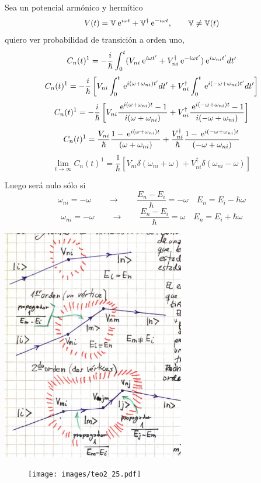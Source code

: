 \documentclass[10pt,oneside]{CBFT_book}
\begin{document}
Sea un potencial armónico y hermítico 
\[
	V(t) = \mathbb{V} \:\mathrm{e}^{i\omega t} + \mathbb{V}^\dagger \:\mathrm{e}^{-i\omega t},
		\qquad \mathbb{V}\neq \mathbb{V}(t)
\]
quiero ver probabilidad de transición a orden uno,
\[
	C_n(t)^1 = -\frac{i}{\hbar} \int_0^t ( V_{ni}\:\mathrm{e}^{i\omega t'}+ V_{ni}^\dagger \:\mathrm{e}^{-i\omega t'} )
		\:\mathrm{e}^{i\omega_{ni}t'}dt'
\]
\[
	C_n(t)^1 = -\frac{i}{\hbar} \left[ V_{ni} \int_0^t \:\mathrm{e}^{i(\omega +\omega_{ni})t'} dt' + 
		V_{ni}^\dagger \int_0^t \:\mathrm{e}^{i(-\omega +\omega_{ni})t'} dt' \right]
\]
\[
	C_n(t)^1 = -\frac{i}{\hbar} \left[ V_{ni} \frac{\:\mathrm{e}^{i(\omega +\omega_{ni})t} -1}{i( \omega +\omega_{ni} )}
		+ V_{ni}^\dagger \frac{\:\mathrm{e}^{i(-\omega +\omega_{ni})t} - 1}{i(-\omega +\omega_{ni})} \right]
\]
\[
	C_n(t)^1 = \frac{V_{ni}}{\hbar} \frac{1-\:\mathrm{e}^{i(\omega +\omega_{ni})t}}{( \omega +\omega_{ni} )}
		+ \frac{V_{ni}^\dagger}{\hbar} \frac{1-\:\mathrm{e}^{i(-\omega +\omega_{ni})t}}{(-\omega +\omega_{ni})}
\]
\[
	\lim_{t\to\infty} C_n(t)^1 = \frac{1}{\hbar}\left[ V_{ni}\delta(\omega_{ni}+\omega) 
		+ V_{ni}^\dagger \delta(\omega_{ni}-\omega) \right]
\]

Luego será nulo sólo si 
\[
	\omega_{ni} = -\omega \qquad \longrightarrow \qquad 
		\frac{E_n - E_i}{\hbar} = -\omega \quad E_n = E_i - \hbar\omega
\]
\[
	\omega_{ni} = -\omega \qquad \longrightarrow \qquad 
		\frac{E_n - E_i}{\hbar} = \omega \quad E_n = E_i + \hbar\omega
\]

\includegraphics[width=0.6\textwidth]{images/fig_ft2_tre_ordenes_perturbativos.jpg}

\begin{figure}[htb]
	\begin{center}
	\texttt{[image: images/teo2\_25.pdf]}
	\end{center}
	\caption{}
\end{figure} 
\end{document}
